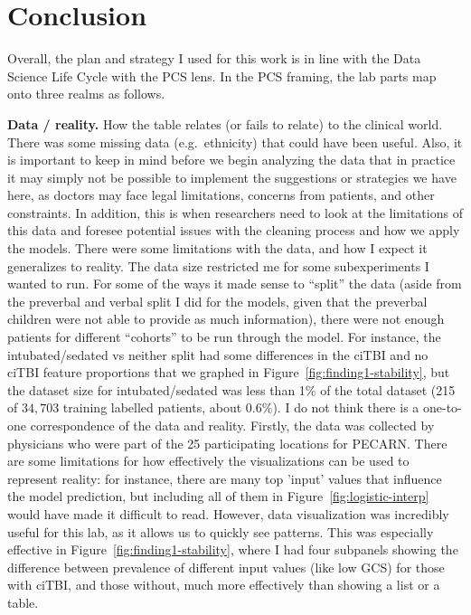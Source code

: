 \documentclass[10pt,letterpaper]{article}
\begin{document}

\section{Conclusion}\label{conclusion}
Overall, the plan and strategy I used for this work is in line with the Data Science Life Cycle with the PCS lens.
In the PCS framing, the lab parts map onto three realms as follows.

\textbf{Data / reality.}
How the table relates (or fails to relate) to the clinical world.
There was some missing data (e.g.\ ethnicity) that could have been useful.
Also, it is important to keep in mind before we begin analyzing the data that in practice it may simply not be possible to implement the suggestions or strategies we have here, as doctors may face legal limitations, concerns from patients, and other constraints.
In addition, this is when researchers need to look at the limitations of this data and foresee potential issues with the cleaning process and how we apply the models.
There were some limitations with the data, and how I expect it generalizes to reality.
The data size restricted me for some subexperiments I wanted to run. For some of the ways it made sense to ``split'' the data (aside from the preverbal and verbal split I did for the models, given that the preverbal children were not able to provide as much information), there were not enough patients for different ``cohorts'' to be run through the model. For instance, the intubated/sedated vs neither split had some differences in the ciTBI and no ciTBI feature proportions that we graphed in Figure~\ref{fig:finding1-stability}, but the dataset size for intubated/sedated was less than 1\% of the total dataset (215 of $34{,}703$ training labelled patients, about $0.6\%$).
I do not think there is a one-to-one correspondence of the data and reality. Firstly, the data was collected by physicians who were part of the 25 participating locations for PECARN.
There are some limitations for how effectively the visualizations can be used to represent reality: for instance, there are many top 'input' values that influence the model prediction, but including all of them in Figure~\ref{fig:logistic-interp} would have made it difficult to read.
However, data visualization was incredibly useful for this lab, as it allows us to quickly see patterns. This was especially effective in Figure~\ref{fig:finding1-stability}, where I had four subpanels showing the difference between prevalence of different input values (like low GCS) for those with ciTBI, and those without, much more effectively than showing a list or a table.
\end{document}
